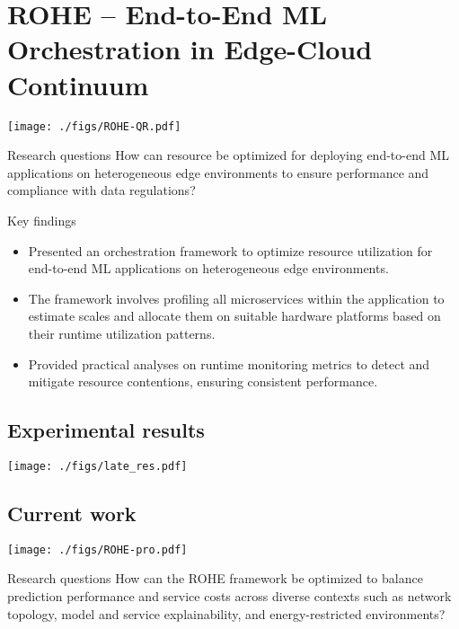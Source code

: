 \documentclass[landscape,a0,final]{a0poster} %
\newcommand{\sectionspace}{10mm} %
\newcommand{\figurespace}{10mm} %
\begin{document}
\begin{minipage}{0.98\linewidth}
\begin{minipage}[t]{0.3\linewidth}
\section{ROHE -- End-to-End ML Orchestration in Edge-Cloud Continuum}
\begin{center}
\texttt{[image: ./figs/ROHE-QR.pdf]}
\end{center}
\begin{myframe}{Research questions}
    How can resource be optimized for deploying end-to-end ML applications on heterogeneous edge environments to ensure performance and compliance with data regulations?
\end{myframe}

\begin{myframe}{Key findings}
\begin{itemize}
    \item Presented an orchestration framework to optimize resource utilization for end-to-end ML applications on heterogeneous edge environments.
    \item The framework involves profiling all microservices within the application to estimate scales and allocate them on suitable hardware platforms based on their runtime utilization patterns.
    \item Provided practical analyses on runtime monitoring metrics to detect and mitigate resource contentions, ensuring consistent performance.
\end{itemize}
\end{myframe}
\subsection*{Experimental results}
\begin{center}
\texttt{[image: ./figs/late\_res.pdf]}
\end{center}
\vspace{-20pt}
\subsection*{Current work}
\texttt{[image: ./figs/ROHE-pro.pdf]}
\begin{myframe}{Research questions}
    How can the ROHE framework be optimized to balance prediction performance and service costs across diverse contexts such as network topology, model and service explainability, and energy-restricted environments?
\end{myframe}


\end{minipage}
\end{minipage}
\end{document}
